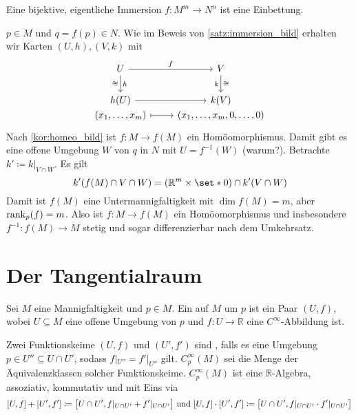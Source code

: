 \begin{satz}
	Eine bijektive, eigentliche Immersion $f \colon M^m \to N^n$ ist eine Einbettung.
\end{satz}
\begin{beweis}
	$p \in M$ und $q =f(p) \in N$.
	Wie im Beweis von \cref{satz:immersion_bild} erhalten wir Karten $(U,h), (V,k)$ mit
	\[
		\begin{tikzcd}
			U \rar["f"] \dar["h","\cong"'] & V \dar["\cong","k"'] \\
			h(U) \rar & k(V) \\[-2em]
			(x_1, \ldots ,x_m) \rar[mapsto] & (x_1, \ldots ,x_m, 0, \ldots ,0)
		\end{tikzcd}
	\]
	Nach \cref{kor:homeo_bild} ist $f \colon M \to f(M)$ ein Homöomorphismus.
	Damit gibt es eine offene Umgebung $W$ von $q$ in $N$ mit $U =f^{-1}(W)$ (warum?).
	Betrachte $k' \coloneqq k|_{V \cap W}$.
	Es gilt 
	\[
		k'(f(M) \cap V \cap W) = (\mathbb{R}^m \times \set*{0}) \cap k'(V \cap W)
	\]
	Damit ist $f(M)$ eine Untermannigfaltigkeit mit $\dim f(M) =m$, aber $\operatorname{rank}_p(f)=m$.
	Also ist $f \colon M \to f(M)$ ein Homöomorphismus und insbesondere $f^{-1} \colon f(M) \to M$ stetig und sogar differenzierbar nach dem Umkehrsatz. 
\end{beweis}


\section{Der Tangentialraum} %
\label{sec:der_tangentialraum}

\begin{definition}[{name=[Funktionskeime]}]
	Sei $M$ eine Mannigfaltigkeit und $p \in M$.
	Ein  auf $M$ um $p$ ist ein Paar $(U,f)$, wobei $U \subseteq M$ eine offene Umgebung von $p$ und $f \colon U \to \mathbb{R}$ eine $C^\infty$-Abbildung ist.
	
	Zwei Funktionskeime $(U,f)$ und $(U',f')$ sind , falls es eine Umgebung $p \in U'' \subseteq U \cap U'$, sodass $f|_{U''} = f'|_{U''}$ gilt.
	$C^\infty_p(M)$ sei die Menge der Äquivalenzklassen solcher Funktionskeime.
	$C^\infty_p(M)$ ist eine $\mathbb{R}$-Algebra, assoziativ, kommutativ und mit Eins via
	\[
		\benbrace*{U,f} + \benbrace*{U',f'} \coloneqq \benbrace[\big]{U \cap U', f|_{U \cap U'} + f'|_{U \cap U'}} \text{ und } 
		\benbrace*{U,f} \cdot  \benbrace*{U',f'} \coloneqq \benbrace[\big]{U \cap U', f|_{U \cap U'} \cdot  f'|_{U \cap U'}}
	\]
\end{definition}


